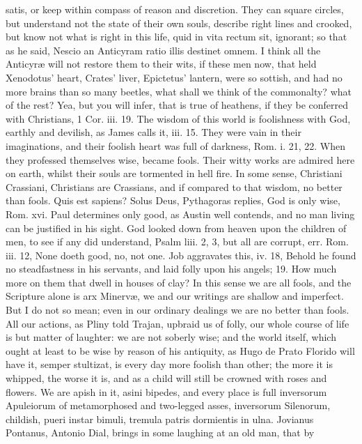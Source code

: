 {satis, or keep within compass of reason and discretion. They can square
circles, but understand not the state of their own souls, describe
right lines and crooked, \etc but know not what is right in this life,
quid in vita rectum sit, ignorant; so that as he said, Nescio an
Anticyram ratio illis destinet omnem. I think all the Anticyr\ae{} will
not restore them to their wits, if these men now, that held 
Xenodotus' heart, Crates' liver, Epictetus' lantern, were so sottish,
and had no more brains than so many beetles, what shall we think of the
commonalty? what of the rest?
Yea, but you will infer, that is true of heathens, if they be conferred
with Christians, 1 Cor. iii. 19. The wisdom of this world is
foolishness with God, earthly and devilish, as James calls it, iii. 15.
They were vain in their imaginations, and their foolish heart was full
of darkness, Rom. i. 21, 22. When they professed themselves wise,
became fools. Their witty works are admired here on earth, whilst their
souls are tormented in hell fire. In some sense, Christiani Crassiani,
Christians are Crassians, and if compared to that wisdom, no better
than fools. Quis est sapiens? Solus Deus, Pythagoras replies, God
is only wise, Rom. xvi. Paul determines only good, as Austin well
contends, and no man living can be justified in his sight. God looked
down from heaven upon the children of men, to see if any did
understand, Psalm liii. 2, 3, but all are corrupt, err. Rom. iii. 12,
None doeth good, no, not one. Job aggravates this, iv. 18, Behold he
found no steadfastness in his servants, and laid folly upon his angels;
19. How much more on them that dwell in houses of clay? In this sense
we are all fools, and the Scripture alone is arx Minerv\ae{}, we and
our writings are shallow and imperfect. But I do not so mean; even in
our ordinary dealings we are no better than fools. All our actions, as
Pliny told Trajan, upbraid us of folly, our whole course of life
is but matter of laughter: we are not soberly wise; and the world
itself, which ought at least to be wise by reason of his antiquity, as
Hugo de Prato Florido will have it, semper stultizat, is every day
more foolish than other; the more it is whipped, the worse it is, and
as a child will still be crowned with roses and flowers. We are apish
in it, asini bipedes, and every place is full inversorum Apuleiorum of
metamorphosed and two-legged asses, inversorum Silenorum, childish,
pueri instar bimuli, tremula patris dormientis in ulna. Jovianus
Pontanus, Antonio Dial, brings in some laughing at an old man, that by
}
